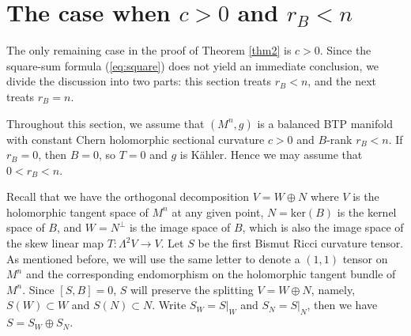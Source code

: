 \documentclass{amsart}
\begin{document}
\vspace{0.3cm}

\section{The case when $c>0$ and $r_B<n$}

The only remaining case in the proof of Theorem \ref{thm2} is $c>0$. Since the square-sum formula (\ref{eq:square}) does not yield an immediate conclusion, we divide the discussion into two parts: this section treats $r_B<n$, and the next treats $r_B=n$.

Throughout this section, we assume that $(M^n,g)$ is a balanced BTP manifold with constant Chern holomorphic sectional curvature $c>0$ and $B$-rank $r_B<n$. If $r_B=0$, then $B=0$, so $T=0$ and $g$ is K\"ahler. Hence we may assume that $0<r_B<n$.

Recall that we have the orthogonal decomposition $V=W\oplus N$ where $V$ is the holomorphic tangent space of $M^n$ at any given point, $N=\mbox{ker}(B)$ is the kernel space of $B$, and $W=N^{\perp}$ is the image space of $B$, which is also the image space of the skew linear map $T:\Lambda^2V \rightarrow V$. Let $S$ be the first Bismut Ricci curvature tensor. As mentioned before, we will use the same letter to denote a $(1,1)$ tensor on $M^n$ and the corresponding endomorphism on the holomorphic tangent bundle of $M^n$. Since $[S,B]=0$, $S$ will preserve the splitting $V=W\oplus N$, namely, $S(W)\subset W$ and $S(N)\subset N$. Write $S_W=S|_W$ and $S_N=S|_N$, then we have
$S=S_W \oplus S_N$.
\end{document}
